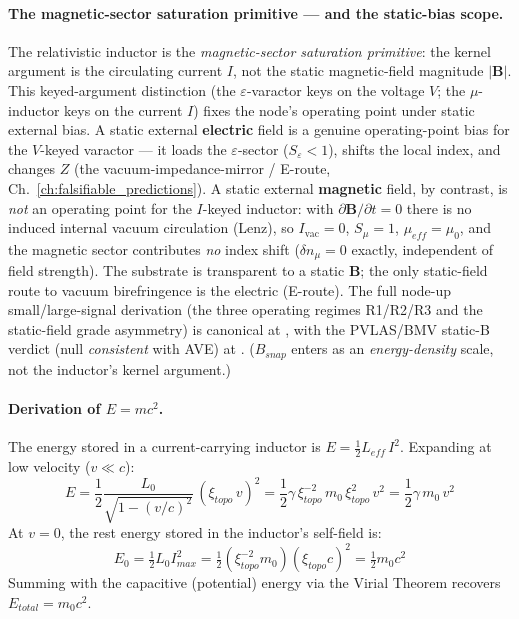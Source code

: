 \paragraph{The magnetic-sector saturation primitive --- and the static-bias scope.}
The relativistic inductor is the \emph{magnetic-sector saturation primitive}: the kernel argument is the circulating current $I$, not the static magnetic-field magnitude $|\mathbf B|$. This keyed-argument distinction (the $\varepsilon$-varactor keys on the voltage $V$; the $\mu$-inductor keys on the current $I$) fixes the node's operating point under static external bias. A static external \textbf{electric} field is a genuine operating-point bias for the $V$-keyed varactor --- it loads the $\varepsilon$-sector ($S_\varepsilon < 1$), shifts the local index, and changes $Z$ (the vacuum-impedance-mirror / E-route, Ch.~\ref{ch:falsifiable_predictions}). A static external \textbf{magnetic} field, by contrast, is \emph{not} an operating point for the $I$-keyed inductor: with $\partial\mathbf B/\partial t = 0$ there is no induced internal vacuum circulation (Lenz), so $I_{\mathrm{vac}} = 0$, $S_\mu = 1$, $\mu_{eff} = \mu_0$, and the magnetic sector contributes \emph{no} index shift ($\delta n_\mu = 0$ exactly, independent of field strength). The substrate is transparent to a static $\mathbf B$; the only static-field route to vacuum birefringence is the electric (E-route). The full node-up small/large-signal derivation (the three operating regimes R1/R2/R3 and the static-field grade asymmetry) is canonical at , with the PVLAS/BMV static-B verdict (null \emph{consistent} with AVE) at . ($B_{snap}$ enters as an \emph{energy-density} scale, not the inductor's kernel argument.)

\paragraph{Derivation of $E = mc^2$.}
The energy stored in a current-carrying inductor is $E = \tfrac{1}{2} L_{eff}\, I^2$. Expanding at low velocity ($v \ll c$):
\begin{equation}
    E = \frac{1}{2} \frac{L_0}{\sqrt{1-(v/c)^2}}\, (\xi_{topo}\, v)^2 = \frac{1}{2} \gamma\, \xi_{topo}^{-2}\, m_0\, \xi_{topo}^2\, v^2 = \frac{1}{2} \gamma\, m_0\, v^2
\end{equation}
At $v = 0$, the rest energy stored in the inductor's self-field is:
\begin{equation}
    E_0 = \tfrac{1}{2} L_0 I_{max}^2 = \tfrac{1}{2} (\xi_{topo}^{-2} m_0)(\xi_{topo} c)^2 = \tfrac{1}{2} m_0 c^2
\end{equation}
Summing with the capacitive (potential) energy via the Virial Theorem recovers $E_{total} = m_0 c^2$.

